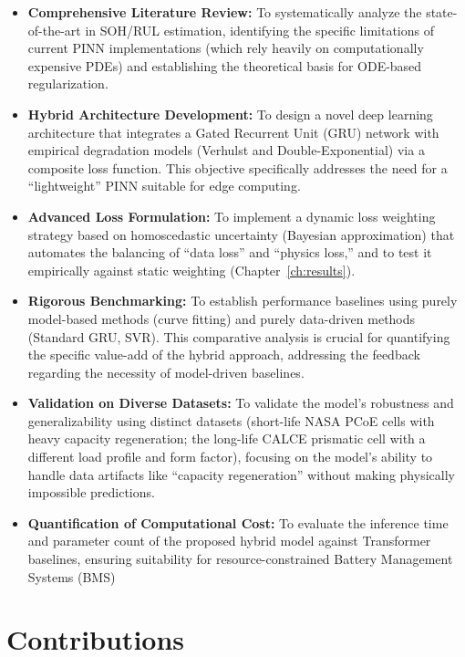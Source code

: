 \begin{itemize}
    \item \textbf{Comprehensive Literature Review:} To systematically analyze the state-of-the-art in SOH/RUL estimation, identifying the specific limitations of current PINN implementations (which rely heavily on computationally expensive PDEs) and establishing the theoretical basis for ODE-based regularization.
    \item \textbf{Hybrid Architecture Development:} To design a novel deep learning architecture that integrates a Gated Recurrent Unit (GRU) network with empirical degradation models (Verhulst and Double-Exponential) via a composite loss function. This objective specifically addresses the need for a ``lightweight'' PINN suitable for edge computing.
    \item \textbf{Advanced Loss Formulation:} To implement a dynamic loss weighting strategy based on homoscedastic uncertainty (Bayesian approximation) that automates the balancing of ``data loss'' and ``physics loss,'' and to test it empirically against static weighting (Chapter~\ref{ch:results}).
    \item \textbf{Rigorous Benchmarking:} To establish performance baselines using purely model-based methods (curve fitting) and purely data-driven methods (Standard GRU, SVR). This comparative analysis is crucial for quantifying the specific value-add of the hybrid approach, addressing the feedback regarding the necessity of model-driven baselines.
    \item \textbf{Validation on Diverse Datasets:} To validate the model's robustness and generalizability using distinct datasets (short-life NASA PCoE cells with heavy capacity regeneration; the long-life CALCE prismatic cell with a different load profile and form factor), focusing on the model's ability to handle data artifacts like ``capacity regeneration'' without making physically impossible predictions.
    \item \textbf{Quantification of Computational Cost:} To evaluate the inference time and parameter count of the proposed hybrid model against Transformer baselines, ensuring suitability for resource-constrained Battery Management Systems (BMS)

    
\end{itemize}

\section{Contributions}

